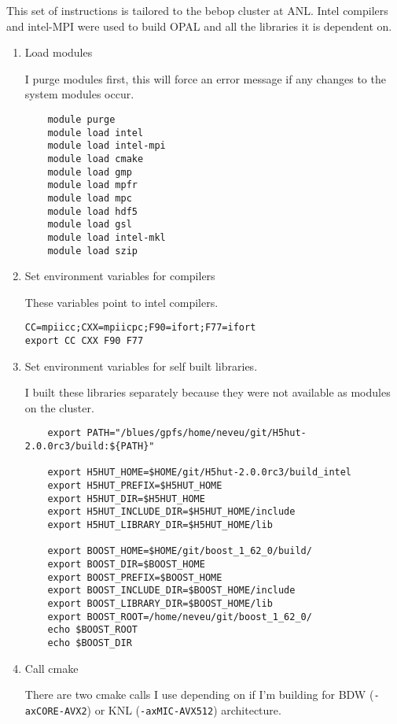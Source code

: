 \documentclass[table]{iitthesis}
\begin{document}
\clearpage


%
%
\appendix

 \label{build}
This set of instructions is tailored to the bebop cluster at ANL. 
Intel compilers and intel-MPI were used to build OPAL and all 
the libraries it is dependent on.
\begin{enumerate}[label=Step \arabic*:]
	\item Load modules 

I purge modules first, this will force an error message if any changes
to the system modules occur.
\begin{lstlisting}
	module purge
	module load intel
	module load intel-mpi 
	module load cmake 
	module load gmp   
	module load mpfr  
	module load mpc   
	module load hdf5   
	module load gsl   
	module load intel-mkl
	module load szip
\end{lstlisting}

    \item Set environment variables for compilers 
 
These variables point to intel compilers. 
\begin{lstlisting}
CC=mpiicc;CXX=mpiicpc;F90=ifort;F77=ifort
export CC CXX F90 F77
\end{lstlisting}

    \item Set environment variables for self built libraries.
    
I built these libraries separately because they were not available as 
modules on the cluster. 

\begin{lstlisting}
	export PATH="/blues/gpfs/home/neveu/git/H5hut-2.0.0rc3/build:${PATH}"
	
	export H5HUT_HOME=$HOME/git/H5hut-2.0.0rc3/build_intel
	export H5HUT_PREFIX=$H5HUT_HOME
	export H5HUT_DIR=$H5HUT_HOME
	export H5HUT_INCLUDE_DIR=$H5HUT_HOME/include
	export H5HUT_LIBRARY_DIR=$H5HUT_HOME/lib
	
	export BOOST_HOME=$HOME/git/boost_1_62_0/build/
	export BOOST_DIR=$BOOST_HOME
	export BOOST_PREFIX=$BOOST_HOME
	export BOOST_INCLUDE_DIR=$BOOST_HOME/include
	export BOOST_LIBRARY_DIR=$BOOST_HOME/lib
	export BOOST_ROOT=/home/neveu/git/boost_1_62_0/
	echo $BOOST_ROOT
	echo $BOOST_DIR
\end{lstlisting}

    \item Call cmake 
    
There are two cmake calls I use depending on if I'm building for 
BDW (\verb|-axCORE-AVX2|) or KNL (\verb|-axMIC-AVX512|) architecture. 
    

\end{enumerate}
\end{document}
